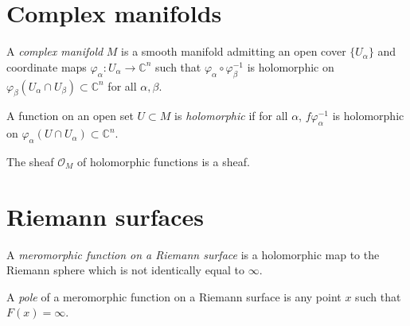 \section{Complex manifolds}
\label{section-complex-manifolds}

\begin{definition}
\label{definition-complex-manifold}
A {\it complex manifold} $M$ is a smooth manifold admitting an open cover
$\{U_\alpha\}$ and coordinate maps $\varphi_\alpha:U_\alpha\to\mathbb{C}^n$ such
that $\varphi_\alpha\circ\varphi_\beta^{-1}$ is holomorphic on
$\varphi_\beta(U_\alpha\cap U_\beta)\subset\mathbb{C}^n$ for all $\alpha,\beta$.
\end{definition}

\begin{definition}
\label{definition-holomorphic-function-on-complex-manifold}
A function on an open set $U\subset M$ is {\it holomorphic} if for all $\alpha$,
$f\varphi_\alpha^{-1}$ is holomorphic on 
$\varphi_\alpha(U\cap U_\alpha)\subset\mathbb{C}^n$.
\end{definition}

\begin{lemma}
\label{lemma-holomorphic-function-sheaf}
The sheaf $\mathcal{O}_M$ of holomorphic functions is a sheaf.
\end{lemma}

\section{Riemann surfaces}
\label{section-Riemann-surfaces}

\begin{definition}
\label{definition-meromorphic-function-on-Riemann-surface}
\begin{reference}
\cite[p. 45]{Donaldson}
\end{reference}
A {\it meromorphic function on a Riemann surface} is a holomorphic map to the
Riemann sphere which is not identically equal to $\infty$.
\end{definition}

\begin{definition}
\label{definition-pole-of-meromorphic-function-on-Riemann-surface}
\begin{reference}
\cite[p. 45]{Donaldson}
\end{reference}
A {\it pole} of a meromorphic function on a Riemann surface is any point $x$ 
such that $F(x)=\infty$.
\end{definition}

